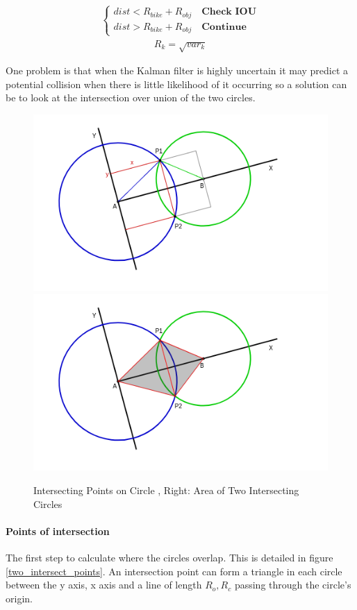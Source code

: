 \documentclass[11pt,twoside]{report}
\begin{document}
\begin{equation}
\begin{aligned}
\begin{cases}
dist < R_{bike} + R_{obj} \quad \textbf{Check IOU} \\
dist > R_{bike} + R_{obj} \quad \textbf{Continue}
\end{cases}
\end{aligned}
\label{horn_eq}
\end{equation}
\begin{align}
R_{k} = \sqrt{var_{k}}
\end{align}


One problem is that when the Kalman filter is highly uncertain it may predict a potential collision when there is little likelihood of it occurring so a solution can be to look at the intersection over union of the two circles.

\noindent \begin{figure}[h!]
	\includegraphics[width = 0.5\hsize]{figures/points_intersecting_circles.png}
	\includegraphics[width = 0.5 \hsize]{figures/two_intersecting_circles.png}
	\caption{Intersecting Points on Circle \cite{circle_intersection_point}, Right: Area of Two Intersecting Circles \cite{circle_intersection}}
	\label{two_intersect_points}
	\label{two_intersect_circles}
\end{figure}

\paragraph{Points of intersection}
The first step to calculate where the circles overlap. This is detailed in figure \ref{two_intersect_points}. An intersection point can form a triangle in each circle between the y axis, x axis and a line of length $R_{o},R_{c}$ passing through the circle's origin.
\end{document}

